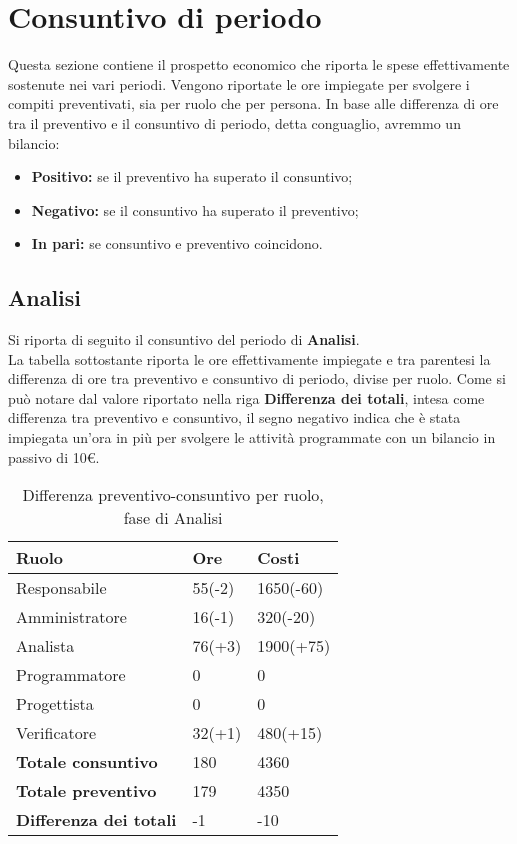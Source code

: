 \section{Consuntivo di periodo}
Questa sezione contiene il prospetto economico che riporta le spese effettivamente sostenute nei vari periodi. Vengono riportate le ore impiegate per svolgere i compiti preventivati, sia per
ruolo che per persona. In base alle differenza di ore tra il preventivo e il consuntivo di periodo, detta conguaglio, avremmo un bilancio:
\begin{itemize}
\item \textbf{Positivo:} se il preventivo ha superato il consuntivo;
\item \textbf{Negativo:} se il consuntivo ha superato il preventivo;
\item \textbf{In pari:} se consuntivo e preventivo coincidono.
\end{itemize}

\subsection{Analisi}

Si riporta di seguito il consuntivo del periodo di \textbf{Analisi}.\\
La tabella sottostante riporta le ore effettivamente impiegate e tra parentesi la differenza di ore tra preventivo  e consuntivo di periodo, divise per ruolo. Come si può notare dal valore riportato nella riga \textbf{Differenza dei totali}, intesa come differenza tra preventivo e consuntivo, il segno negativo indica che è stata impiegata un'ora in più per svolgere le attività programmate con un bilancio in passivo di 10\euro.

	\begin{table}[H]
		\centering
	  \begin{tabular}{p{}p{}
		    							p{}}
		   \toprule Ruolo & Ore & Costi \\
		   \midrule
		   Responsabile & 55(-2) & 1650(-60) \\
		   Amministratore & 16(-1) & 320(-20) \\
		   Analista & 76(+3) & 1900(+75) \\
		   Programmatore & 0 & 0 \\
		   Progettista & 0 & 0 \\
		   Verificatore & 32(+1) & 480(+15) \\
		   \hline
		   \textbf{Totale consuntivo} & 180 & 4360 \\
		   \textbf{Totale preventivo} & 179 & 4350 \\
		   \textbf{Differenza dei totali} & -1 & -10 \\
		   \bottomrule
	 \end{tabular}
	 	\label{tab:costuntivoRequisiti}
	 	\caption{Differenza preventivo-consuntivo per ruolo, fase di Analisi}
	\end{table}

